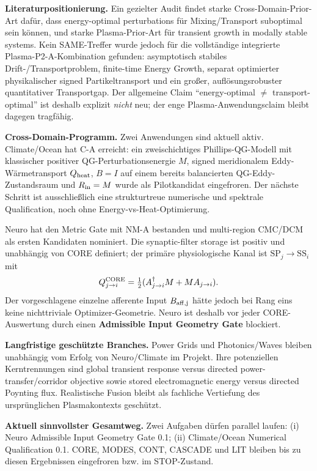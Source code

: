 \textbf{Literaturpositionierung.} Ein gezielter Audit findet starke Cross-Domain-Prior-Art dafür, dass energy-optimal perturbations für Mixing/Transport suboptimal sein können, und starke Plasma-Prior-Art für transient growth in modally stable systems. Kein SAME-Treffer wurde jedoch für die vollständige integrierte Plasma-P2-A-Kombination gefunden: asymptotisch stabiles Drift-/Transportproblem, finite-time Energy Growth, separat optimierter physikalischer signed Partikeltransport und ein großer, auflösungsrobuster quantitativer Transportgap. Der allgemeine Claim ``energy-optimal $\neq$ transport-optimal'' ist deshalb explizit \emph{nicht} neu; der enge Plasma-Anwendungsclaim bleibt dagegen tragfähig.

\textbf{Cross-Domain-Programm.} Zwei Anwendungen sind aktuell aktiv. Climate/Ocean hat C-A erreicht: ein zweischichtiges Phillips-QG-Modell mit klassischer positiver QG-Perturbationsenergie $M$, signed meridionalem Eddy-Wärmetransport $Q_{\rm heat}$, $B=I$ auf einem bereits balancierten QG-Eddy-Zustandsraum und $R_{\rm in}=M$ wurde als Pilotkandidat eingefroren. Der nächste Schritt ist ausschließlich eine strukturtreue numerische und spektrale Qualification, noch ohne Energy-vs-Heat-Optimierung.

Neuro hat den Metric Gate mit NM-A bestanden und multi-region CMC/DCM als ersten Kandidaten nominiert. Die synaptic-filter storage ist positiv und unabhängig von CORE definiert; der primäre physiologische Kanal ist $\mathrm{SP}_j\to\mathrm{SS}_i$ mit
\[
Q_{j\to i}^{\rm CORE}=\tfrac12(A_{j\to i}^\dagger M+MA_{j\to i}).
\]
Der vorgeschlagene einzelne afferente Input $B_{\rm aff,j}$ hätte jedoch bei Rang eins keine nichttriviale Optimizer-Geometrie. Neuro ist deshalb vor jeder CORE-Auswertung durch einen \textbf{Admissible Input Geometry Gate} blockiert.

\textbf{Langfristige geschützte Branches.} Power Grids und Photonics/Waves bleiben unabhängig vom Erfolg von Neuro/Climate im Projekt. Ihre potenziellen Kerntrennungen sind global transient response versus directed power-transfer/corridor objective sowie stored electromagnetic energy versus directed Poynting flux. Realistische Fusion bleibt als fachliche Vertiefung des ursprünglichen Plasmakontexts geschützt.

\textbf{Aktuell sinnvollster Gesamtweg.} Zwei Aufgaben dürfen parallel laufen: (i) Neuro Admissible Input Geometry Gate 0.1; (ii) Climate/Ocean Numerical Qualification 0.1. CORE, MODES, CONT, CASCADE und LIT bleiben bis zu diesen Ergebnissen eingefroren bzw. im STOP-Zustand.

\newpage
\tableofcontents
\newpage
